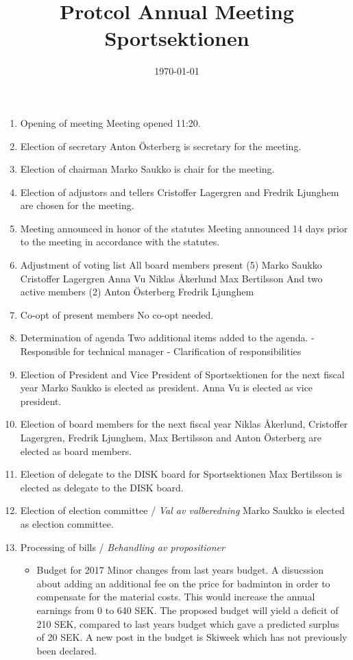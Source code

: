 \documentclass[12pt,a4paper]{article}
\begin{document}
	\title{\Huge Protcol Annual Meeting Sportsektionen}
	\date{\today}
	\maketitle

	\null
	\vfill

	\clearpage

	\begin{enumerate}

		\item Opening of meeting
			Meeting opened 11:20.
		\item Election of secretary
			Anton Österberg is secretary for the meeting.
		\item Election of chairman
			Marko Saukko is chair for the meeting.
		\item Election of adjustors and tellers
			Cristoffer Lagergren and Fredrik Ljunghem are chosen for the meeting.
		\item Meeting announced in honor of the statutes
			Meeting announced 14 days prior to the meeting in accordance with the statutes.
		\item Adjustment of voting list
			All board members present (5)
				Marko Saukko
				Cristoffer Lagergren
				Anna Vu
				Niklas Åkerlund
				Max Bertilsson
			And two active members (2)
				Anton Österberg
				Fredrik Ljunghem
		\item Co-opt of present members
			No co-opt needed.
		\item Determination of agenda
			Two additional items added to the agenda.
			- Responsible for technical manager
			- Clarification of responsibilities
		\item Election of President and Vice President of Sportsektionen for the next fiscal year
			Marko Saukko is elected as president.
			Anna Vu is elected as vice president.
		\item Election of board members for the next fiscal year
			Niklas Åkerlund, Cristoffer Lagergren, Fredrik Ljunghem, Max Bertilsson and Anton Österberg are elected as board members.
		\item Election of delegate to the DISK board for Sportsektionen
			Max Bertilsson is elected as delegate to the DISK board.
		\item Election of election committee / \emph{Val av valberedning}
			Marko Saukko is elected as election committee.
		\item Processing of bills / \emph{Behandling av propositioner}
			\begin{itemize}
				\item Budget for 2017
					Minor changes from last years budget. A disucssion about adding an additional fee on the price for badminton in order to compensate for the material costs. This would increase the annual earnings from 0 to 640 SEK. The proposed budget will yield a deficit of 210 SEK, compared to last years budget which gave a predicted surplus of 20 SEK. A new post in the budget is Skiweek which has not previously been declared.


\end{itemize}
\end{enumerate}
\end{document}

